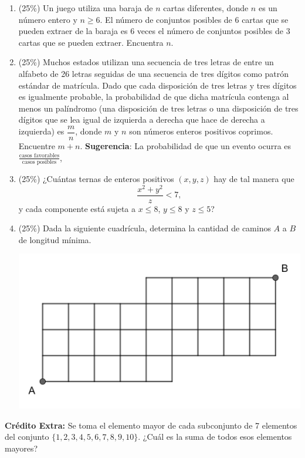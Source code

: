 
\vspace{0.3cm}
\begin{enumerate}
    \item (25\%) Un juego utiliza una baraja de $n$ cartas diferentes, donde $n$ es un número entero y $n \geq 6.$ El número de conjuntos posibles de 6 cartas que se pueden extraer de la baraja es 6 veces el número de conjuntos posibles de 3 cartas que se pueden extraer. Encuentra $n$.\vspace{0.3cm}


    
    \item (25\%) Muchos estados utilizan una secuencia de tres letras de entre un alfabeto de 26 letras seguidas de una secuencia de tres dígitos como patrón estándar de matrícula. Dado que cada disposición de tres letras y tres dígitos es igualmente probable, la probabilidad de que dicha matrícula contenga al menos un palíndromo (una disposición de tres letras o una disposición de tres dígitos que se lea igual de izquierda a derecha que hace de derecha a izquierda) es $\dfrac{m}{n}$, donde $m$ y $n$ son números enteros positivos coprimos. Encuentre $m+n$. \textbf{Sugerencia}: La probabilidad de que un evento ocurra es $\displaystyle \frac{\text{casos favorables}}{\text{casos posibles}}$, 
\vspace{0.3cm}
 
    \item (25\%) ¿Cuántas ternas de enteros positivos $(x,y,z)$ hay de tal manera que
\[\frac{x^2+y^2}{z}< 7,\]
y cada componente está sujeta a $x\leq 8$, $y\leq 8$ y $z\leq 5$? \vspace{0.3cm}


    \item (25\%) Dada la siguiente cuadrícula, determina la cantidad de caminos $A$ a $B$ de longitud mínima.

    \begin{center}
        \includegraphics[scale=0.65]{Imagenes/S1/s1.png}
    \end{center}

    
\end{enumerate}

\textbf{Crédito Extra:} Se toma el elemento mayor de cada subconjunto de 7 elementos del conjunto $\{ 1,2,3,4,5,6,7,8,9,10 \}$. ¿Cuál es la suma de todos esos elementos mayores?